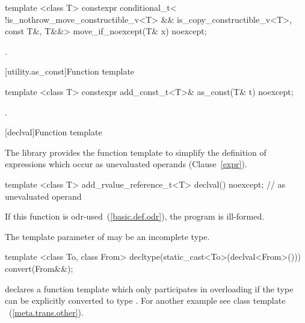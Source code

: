 %
\begin{itemdecl}
template <class T> constexpr conditional_t<
    !is_nothrow_move_constructible_v<T> && is_copy_constructible_v<T>, const T&, T&&>
  move_if_noexcept(T& x) noexcept;
\end{itemdecl}

\begin{itemdescr}
\pnum
\returns {}.
\end{itemdescr}

[utility.as_const]{Function template }

%
\begin{itemdecl}
template <class T> constexpr add_const_t<T>& as_const(T& t) noexcept;
\end{itemdecl}

\begin{itemdescr}
\pnum
\returns {}.
\end{itemdescr}

[declval]{Function template }

\pnum
The library provides the function template  to simplify the definition of
expressions which occur as unevaluated operands (Clause~\ref{expr}).

%
\begin{itemdecl}
template <class T> add_rvalue_reference_t<T> declval() noexcept;    // as unevaluated operand
\end{itemdecl}

\begin{itemdescr}
\pnum
\remarks If this function is odr-used~(\ref{basic.def.odr}), the program is ill-formed.

\pnum
\remarks The template parameter  of  may be an incomplete type.
\end{itemdescr}

\pnum
\begin{example}
\begin{codeblock}
template <class To, class From> decltype(static_cast<To>(declval<From>())) convert(From&&);
\end{codeblock}
declares a function template  which only participates in overloading if the
type  can be explicitly converted to type . For another example see class
template ~(\ref{meta.trans.other}).
\end{example}


